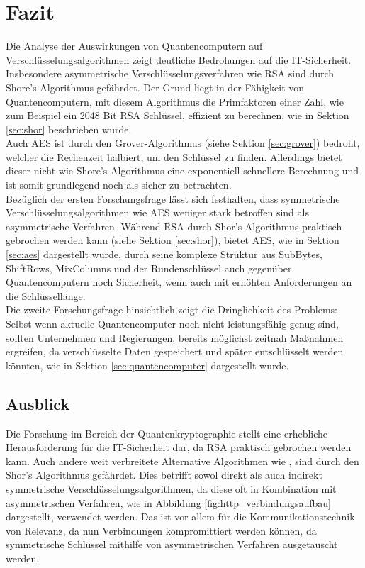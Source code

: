 \section{Fazit}
Die Analyse der Auswirkungen von Quantencomputern auf Verschlüsselungsalgorithmen
zeigt deutliche Bedrohungen auf die IT-Sicherheit. Insbesondere asymmetrische 
Verschlüsselungsverfahren wie RSA sind durch Shore's Algorithmus gefährdet. 
Der Grund liegt in der Fähigkeit von Quantencomputern, mit diesem Algorithmus
die Primfaktoren einer Zahl, wie zum Beispiel ein 2048 Bit RSA Schlüssel, 
effizient zu berechnen, wie in Sektion \ref{sec:shor} beschrieben wurde.\\
Auch AES ist durch den Grover-Algorithmus (siehe Sektion \ref{sec:grover}) bedroht, welcher die Rechenzeit 
halbiert, um den Schlüssel zu finden. Allerdings bietet dieser 
nicht wie Shore's Algorithmus eine exponentiell schnellere Berechnung und ist somit
grundlegend noch als sicher zu betrachten.\\
Bezüglich der ersten Forschungsfrage lässt sich festhalten, dass symmetrische 
Verschlüsselungsalgorithmen wie AES weniger stark betroffen sind als 
asymmetrische Verfahren. Während RSA durch Shor's Algorithmus praktisch 
gebrochen werden kann (siehe Sektion \ref{sec:shor}), bietet AES,
wie in Sektion \ref{sec:aes} dargestellt wurde, durch seine komplexe Struktur aus SubBytes, 
ShiftRows, MixColumns und der Rundenschlüssel auch gegenüber Quantencomputern 
noch Sicherheit, wenn auch mit erhöhten Anforderungen an die Schlüssellänge.\\
Die zweite Forschungsfrage hinsichtlich 
zeigt die Dringlichkeit des Problems: Selbst wenn 
aktuelle Quantencomputer noch nicht leistungsfähig 
genug sind, sollten Unternehmen und Regierungen, bereits möglichst zeitnah 
Maßnahmen ergreifen, da verschlüsselte Daten gespeichert 
und später entschlüsselt werden könnten, wie in Sektion 
\ref{sec:quantencomputer} dargestellt wurde.\\

\subsection{Ausblick}
Die Forschung im Bereich der Quantenkryptographie stellt eine erhebliche 
Herausforderung für die IT-Sicherheit dar, da RSA praktisch gebrochen werden 
kann. Auch andere weit verbreitete Alternative Algorithmen wie ,
sind durch den Shor's Algorithmus gefährdet. Dies betrifft sowol direkt als auch indirekt symmetrische
Verschlüsselungsalgorithmen, da diese oft in Kombination 
mit asymmetrischen Verfahren, wie in Abbildung \ref{fig:http_verbindungsaufbau} dargestellt, 
verwendet werden. Das ist vor allem für die Kommunikationstechnik von Relevanz, da nun
Verbindungen kompromittiert werden können, da symmetrische Schlüssel mithilfe
von asymmetrischen Verfahren ausgetauscht werden.\\


